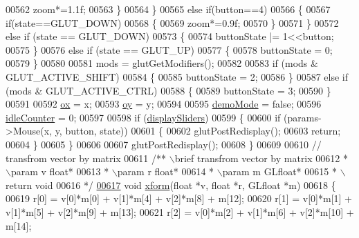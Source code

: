 \begin{DoxyCode}
{{{{{{{00562                         zoom*=1.1f;
00563                 \}
00564         \}
00565         \textcolor{keywordflow}{else} \textcolor{keywordflow}{if}(button==4)
00566         \{
00567                 \textcolor{keywordflow}{if}(state==GLUT\_DOWN)
00568                 \{
00569                         zoom*=0.9f;
00570                 \}
00571         \}
00572     \textcolor{keywordflow}{else} \textcolor{keywordflow}{if} (state == GLUT\_DOWN)
00573     \{
00574         buttonState |= 1<<button;
00575     \}
00576     \textcolor{keywordflow}{else} \textcolor{keywordflow}{if} (state == GLUT\_UP)
00577     \{
00578         buttonState = 0;
00579     \}
00580 
00581     mods = glutGetModifiers();
00582 
00583     \textcolor{keywordflow}{if} (mods & GLUT\_ACTIVE\_SHIFT)
00584     \{
00585         buttonState = 2;
00586     \}
00587     \textcolor{keywordflow}{else} \textcolor{keywordflow}{if} (mods & GLUT\_ACTIVE\_CTRL)
00588     \{
00589         buttonState = 3;
00590     \}
00591 
00592     \hyperlink{particles_8cpp_afef635ed3c73fc60d8faf6dd610c4298}{ox} = x;
00593     \hyperlink{particles_8cpp_a791e26888be6777cd5c5d0c736a06821}{oy} = y;
00594 
00595     \hyperlink{particles_8cpp_a9349b8b38abdf797b46a9e80020286e7}{demoMode} = \textcolor{keyword}{false};
00596     \hyperlink{particles_8cpp_a0c97fe3f7367dfa94ab0d5976ed785a8}{idleCounter} = 0;
00597 
00598     \textcolor{keywordflow}{if} (\hyperlink{particles_8cpp_ac345a677e529047cf89d33fc26f10fe7}{displaySliders})
00599     \{
00600         \textcolor{keywordflow}{if} (params->Mouse(x, y, button, state))
00601         \{
00602             glutPostRedisplay();
00603             \textcolor{keywordflow}{return};
00604         \}
00605     \}
00606 
00607     glutPostRedisplay();
00608 \}
00609 
00610 \textcolor{comment}{// transfrom vector by matrix}
00611 \textcolor{comment}{/** \(\backslash\)brief transfrom vector by matrix}
00612 \textcolor{comment}{ * \(\backslash\)param v float*}
00613 \textcolor{comment}{ * \(\backslash\)param r float*}
00614 \textcolor{comment}{ * \(\backslash\)param m GLfloat*}
00615 \textcolor{comment}{ * \(\backslash\)return void}
00616 \textcolor{comment}{ */}
\hypertarget{particles_8cpp_source_l00617}{}\hyperlink{particles_8cpp_ad95532e0e925e7584a930b366a613261}{00617} \textcolor{keywordtype}{void} \hyperlink{particles_8cpp_ad95532e0e925e7584a930b366a613261}{xform}(\textcolor{keywordtype}{float} *v, \textcolor{keywordtype}{float} *r, GLfloat *m)
00618 \{
00619     r[0] = v[0]*m[0] + v[1]*m[4] + v[2]*m[8] + m[12];
00620     r[1] = v[0]*m[1] + v[1]*m[5] + v[2]*m[9] + m[13];
00621     r[2] = v[0]*m[2] + v[1]*m[6] + v[2]*m[10] + m[14];
}}}}}}}
\end{DoxyCode}
